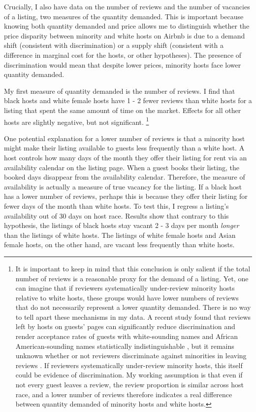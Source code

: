 Crucially, I also have data on the number of reviews and the number of vacancies of a listing, two measures of the quantity demanded. This is important because knowing both quantity demanded and price allows me to distinguish whether the price disparity between minority and white hosts on Airbnb is due to a demand shift (consistent with discrimination) or a supply shift (consistent with a difference in marginal cost for the hosts, or other hypotheses). The presence of discrimination would mean that despite lower prices, minority hosts face lower quantity demanded. 

My first measure of quantity demanded is the number of reviews. I find that black hosts and white female hosts have 1 - 2 fewer reviews than white hosts for a listing that spent the same amount of time on the market. Effects for all other hosts are slightly negative, but not significant.%
	\footnote{It is important to keep in mind that this conclusion is only salient if the total number of reviews is a reasonable proxy for the demand of a listing. Yet, one can imagine that if reviewers systematically under-review minority hosts relative to white hosts, these groups would have lower numbers of reviews that do not necessarily represent a lower quantity demanded. There is no way to tell apart these mechanisms in my data. A recent study found that reviews left by hosts on guests’ pages can significantly reduce discrimination and render acceptance rates of guests with white-sounding names and African American-sounding names statistically indistinguishable \citep{cui}, but it remains unknown whether or not reviewers discriminate against minorities in leaving reviews \citep{ye}. If reviewers systematically under-review minority hosts, this itself could be evidence of discrimination. My working assumption is that even if not every guest leaves a review, the review proportion is similar across host race, and a lower number of reviews therefore indicates a real difference between quantity demanded of minority hosts and white hosts.}
	
One potential explanation for a lower number of reviews is that a minority host might make their listing available to guests less frequently than a white host. A host controls how many days of the month they offer their listing for rent via an availability calendar on the listing page. When a guest books their listing, the booked days disappear from the availability calendar. Therefore, the measure of availability is actually a measure of true vacancy for the listing. If a black host has a lower number of reviews, perhaps this is because they offer their listing for fewer days of the month than white hosts. To test this, I regress a listing's availability out of 30 days on host race. Results show that contrary to this hypothesis, the listings of black hosts stay vacant 2 - 3 days per month \textit{longer} than the listings of white hosts. The listings of white female hosts and Asian female hosts, on the other hand, are vacant less frequently than white hosts.

